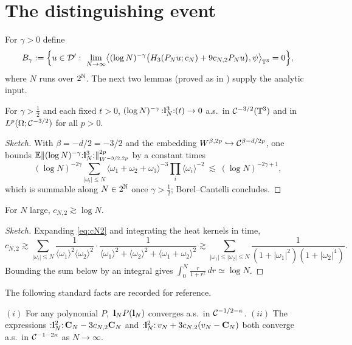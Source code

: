 \documentclass[11pt]{article}
\begin{document}
\section*{The distinguishing event}

For $\gamma>0$ define
\[
B_\gamma:=\Bigl\{u\in\qoneD':\ \lim_{N\to\infty}\bigl\langle(\log N)^{-\gamma}\bigl(\qoneHp_3(\qonePN u;c_N)+9c_{N,2}\qonePN u\bigr),\psi\bigr\rangle_{\qoneT^3}=0\Bigr\},
\]
where $N$ runs over $2^{\mathbb{N}}$. The next two lemmas (proved as in
\cite[Lems.~3.11--3.12]{HKN24}) supply the analytic input.

\begin{qonelemma}\label{lem:cube}
For $\gamma>\tfrac12$ and each fixed $t>0$,
$(\log N)^{-\gamma}\,{:}\mathbf{l}_N^3{:}(t)\to0$ a.s.\ in $\mathcal{C}^{-3/2}(\mathbb{T}^3)$ and in
$L^p(\Omega;\mathcal{C}^{-3/2})$ for all $p>0$.
\end{qonelemma}

\begin{proof}[Sketch]
With $\beta=-d/2=-3/2$ and the embedding $W^{\beta,2p}\hookrightarrow
\mathcal{C}^{\beta-d/2p}$, one bounds
$\mathbb{E}\|(\log N)^{-\gamma}{:}\mathbf{l}_N^3{:}\|_{W^{-3/2,2p}}^{2p}$ by a constant times
\[
(\log N)^{-2\gamma}\sum_{|\omega_i|\le N}\langle\omega_1+\omega_2+\omega_3\rangle^{-3}\prod_{i}\langle\omega_i\rangle^{-2}
\ \lesssim\ (\log N)^{-2\gamma+1},
\]
which is summable along $N\in2^{\mathbb{N}}$ once $\gamma>\tfrac12$; Borel--Cantelli
concludes.
\end{proof}

\begin{qonelemma}\label{lem:logdiv}
For $N$ large, $c_{N,2}\gtrsim\log N$.
\end{qonelemma}

\begin{proof}[Sketch]
Expanding \eqref{eq:cN2} and integrating the heat kernels in time,
\[
c_{N,2}\gtrsim\sum_{|\omega_i|\le N}\frac{1}{\langle\omega_1\rangle^2\langle\omega_2\rangle^2}\cdot\frac{1}{\langle\omega_1\rangle^2+\langle\omega_2\rangle^2+\langle\omega_1+\omega_2\rangle^2}
\gtrsim\sum_{|\omega_1|\le|\omega_2|\le N}\frac{1}{(1+|\omega_1|^2)(1+|\omega_2|^4)}.
\]
Bounding the sum below by an integral gives
$\int_0^N\frac{r}{1+r^2}\,dr\simeq\log N$.
\end{proof}

The following standard facts are recorded for reference.

\begin{qonelemma}\label{lem:std}
$(i)$ For any polynomial $P$, $\,\mathbf{l}_N P(\mathbf{l}_N)$ converges a.s.\ in
$\mathcal{C}^{-1/2-\kappa}$. $(ii)$ The expressions ${:}\mathbf{l}_N^2{:}\,\mathbf{C}_N-3c_{N,2}\mathbf{C}_N$
and ${:}\mathbf{l}_N^2{:}\,v_N+3c_{N,2}(v_N-\mathbf{C}_N)$ both converge a.s.\ in
$\mathcal{C}^{-1-2\kappa}$ as $N\to\infty$.
\end{qonelemma}
\end{document}
